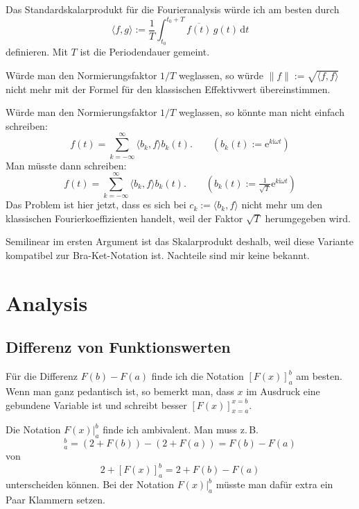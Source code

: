 \documentclass[a4paper,11pt,fleqn,twoside,BCOR=16mm]{scrartcl}
\newcommand{\ee}{\mathrm e}
\newcommand{\ui}{\mathrm i}
\begin{document}
Das Standardskalarprodukt für die Fourieranalysis würde ich
am besten durch
\begin{equation}\label{eq:FourierSP}
\langle f,g\rangle := \frac{1}{T}\int_{t_0}^{t_0+T}
\overline{f(t)}\,g(t)\,\mathrm dt
\end{equation}
definieren. Mit $T$ ist die Periodendauer gemeint.

Würde man den Normierungsfaktor $1/T$ weglassen, so würde
$\|f\|:=\sqrt{\langle f,f\rangle}$ nicht mehr mit der Formel
für den klassischen Effektivwert übereinstimmen.

Würde man den Normierungsfaktor $1/T$ weglassen, so könnte man
nicht einfach schreiben:
\begin{equation}
f(t) = \sum_{k=-\infty}^\infty \langle b_k,f\rangle b_k(t).
\qquad (b_k(t):=\ee^{k\ui \omega t})
\end{equation}
Man müsste dann schreiben:
\begin{equation}
f(t) = \sum_{k=-\infty}^{\infty} \langle b_k,f\rangle b_k(t).
\qquad(b_k(t):=\tfrac{1}{\sqrt{T}}\ee^{k\ui \omega t})
\end{equation}
Das Problem ist hier jetzt, dass es sich bei $c_k:=\langle b_k,f\rangle$
nicht mehr um den klassischen Fourierkoeffizienten handelt, weil
der Faktor $\sqrt{T}$ herumgegeben wird.

Semilinear im ersten Argument ist das Skalarprodukt deshalb, weil
diese Variante kompatibel zur Bra-Ket-Notation ist. Nachteile sind
mir keine bekannt.

\section{Analysis}
\subsection{Differenz von Funktionswerten}
Für die Differenz $F(b)-F(a)$ finde ich die Notation $[F(x)]_a^b$
am besten. Wenn man ganz pedantisch ist, so bemerkt man, dass
$x$ im Ausdruck eine gebundene Variable ist und schreibt besser
$[F(x)]_{x=a}^{x=b}$.

Die Notation $F(x)|_a^b$ finde ich ambivalent. Man muss z.\,B.
\begin{equation}
[2+F(x)]_a^b = (2+F(b))-(2+F(a)) = F(b)-F(a)
\end{equation}
von
\begin{equation}
2+[F(x)]_a^b = 2+F(b)-F(a)
\end{equation}
unterscheiden können. Bei der Notation $F(x)|_a^b$ müsste
man dafür extra ein Paar Klammern setzen.
\end{document}
